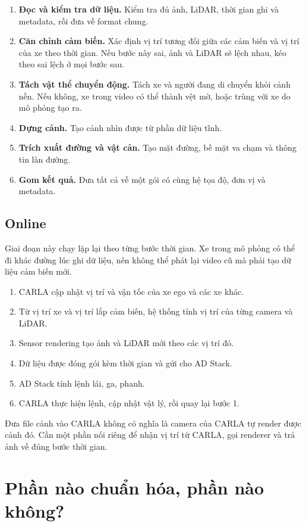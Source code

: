 \begin{enumerate}
  \item \textbf{Đọc và kiểm tra dữ liệu.} Kiểm tra đủ ảnh, LiDAR, thời gian ghi và metadata, rồi đưa về format chung.
  \item \textbf{Căn chỉnh cảm biến.} Xác định vị trí tương đối giữa các cảm biến và vị trí của xe theo thời gian. Nếu bước này sai, ảnh và LiDAR sẽ lệch nhau, kéo theo sai lệch ở mọi bước sau.
  \item \textbf{Tách vật thể chuyển động.} Tách xe và người đang di chuyển khỏi cảnh nền. Nếu không, xe trong video có thể thành vệt mờ, hoặc trùng với xe do mô phỏng tạo ra.
  \item \textbf{Dựng cảnh.} Tạo cảnh nhìn được từ phần dữ liệu tĩnh.
  \item \textbf{Trích xuất đường và vật cản.} Tạo mặt đường, bề mặt va chạm và thông tin làn đường.
  \item \textbf{Gom kết quả.} Đưa tất cả về một gói có cùng hệ tọa độ, đơn vị và metadata.
\end{enumerate}

\subsection{Online}

Giai đoạn này chạy lặp lại theo từng bước thời gian. Xe trong mô phỏng có thể đi khác đường lúc ghi dữ liệu, nên không thể phát lại video cũ mà phải tạo dữ liệu cảm biến mới.

\begin{enumerate}
  \item CARLA cập nhật vị trí và vận tốc của xe ego và các xe khác.
  \item Từ vị trí xe và vị trí lắp cảm biến, hệ thống tính vị trí của từng camera và LiDAR.
  \item Sensor rendering tạo ảnh và LiDAR mới theo các vị trí đó.
  \item Dữ liệu được đóng gói kèm thời gian và gửi cho AD Stack.
  \item AD Stack tính lệnh lái, ga, phanh.
  \item CARLA thực hiện lệnh, cập nhật vật lý, rồi quay lại bước 1.
\end{enumerate}

Đưa file cảnh vào CARLA không có nghĩa là camera của CARLA tự render được cảnh đó.
Cần một phần nối riêng để nhận vị trí từ CARLA, gọi renderer và trả ảnh về đúng bước thời gian.

\section{Phần nào chuẩn hóa, phần nào không?}

